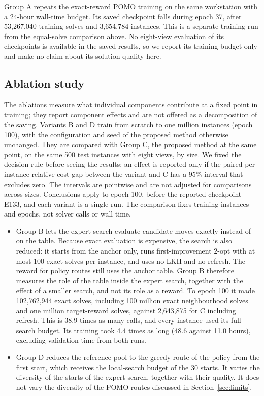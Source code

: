 \documentclass[preprint,12pt,authoryear]{elsarticle}
\begin{document}
Group A repeats the exact-reward POMO training on the same workstation with a 24-hour wall-time budget. Its saved checkpoint falls during epoch 37, after 53,267,040 training solves and 3,654,784 instances. This is a separate training run from the equal-solve comparison above. No eight-view evaluation of its checkpoints is available in the saved results, so we report its training budget only and make no claim about its solution quality here.

\subsection{Ablation study}
\label{sec:ablation}

The ablations measure what individual components contribute at a fixed point in training; they report component effects and are not offered as a decomposition of the saving. Variants B and D train from scratch to one million instances (epoch 100), with the configuration and seed of the proposed method otherwise unchanged. They are compared with Group C, the proposed method at the same point, on the same 500 test instances with eight views, by size. We fixed the decision rule before seeing the results: an effect is reported only if the paired per-instance relative cost gap between the variant and C has a 95\% interval that excludes zero. The intervals are pointwise and are not adjusted for comparisons across sizes. Conclusions apply to epoch 100, before the reported checkpoint E133, and each variant is a single run. The comparison fixes training instances and epochs, not solver calls or wall time.
\begin{itemize}
\item Group B lets the expert search evaluate candidate moves exactly instead of on the table. Because exact evaluation is expensive, the search is also reduced: it starts from the anchor only, runs first-improvement 2-opt with at most 100 exact solves per instance, and uses no LKH and no refresh. The reward for policy routes still uses the anchor table. Group B therefore measures the role of the table inside the expert search, together with the effect of a smaller search, and not its role as a reward. To epoch 100 it made 102,762,944 exact solves, including 100 million exact neighbourhood solves and one million target-reward solves, against 2,643,875 for C including refresh. This is 38.9 times as many calls, and every instance used its full search budget. Its training took 4.4 times as long (48.6 against 11.0 hours), excluding validation time from both runs.
\item Group D reduces the reference pool to the greedy route of the policy from the first start, which receives the local-search budget of the 30 starts. It varies the diversity of the starts of the expert search, together with their quality. It does not vary the diversity of the POMO routes discussed in Section~\ref{sec:limits}.
\end{itemize}
\end{document}
